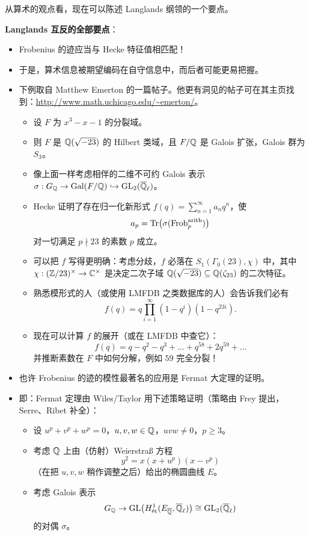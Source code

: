 从算术的观点看，现在可以陈述 Langlands 纲领的一个要点。

\textbf{Langlands 互反的全部要点}：
\begin{itemize}
\item Frobenius 的迹应当与 Hecke 特征值相匹配！
\item 于是，算术信息被期望编码在自守信息中，而后者可能更易把握。
\item 下例取自 Matthew Emerton 的一篇帖子。他更有洞见的帖子可在其主页找到：\url{http://www.math.uchicago.edu/~emerton/}。
\begin{itemize}
\item 设 $F$ 为 $x^3-x-1$ 的分裂域。
\item 则 $F$ 是 $\mathbb{Q}(\sqrt{-23})$ 的 Hilbert 类域，且 $F/\mathbb{Q}$ 是 Galois 扩张，Galois 群为 $S_3$。
\item 像上面一样考虑相伴的二维不可约 Galois 表示 $\sigma:G_{\mathbb{Q}}\to\operatorname{Gal}(F/\mathbb{Q})\hookrightarrow\operatorname{GL}_2(\overline{\mathbb{Q}}_\ell)$。
\item Hecke 证明了存在归一化新形式 $f(q)=\sum_{n=1}^\infty a_nq^n$，使
\[
a_p=\operatorname{Tr}\bigl(\sigma(\operatorname{Frob}_p^{\mathrm{arith}})\bigr)
\]
对一切满足 $p\nmid23$ 的素数 $p$ 成立。
\item 可以把 $f$ 写得更明确：考虑分歧，$f$ 必落在 $S_1(\Gamma_0(23),\chi)$ 中，其中 $\chi:(\mathbb{Z}/23)^\times\to\mathbb{C}^\times$ 是决定二次子域 $\mathbb{Q}(\sqrt{-23})\subseteq\mathbb{Q}(\zeta_{23})$ 的二次特征。
\item 熟悉模形式的人（或使用 LMFDB 之类数据库的人）会告诉我们必有
\[
f(q)=q\prod_{i=1}^\infty(1-q^i)(1-q^{23i}).
\]
\item 现在可以计算 $f$ 的展开（或在 LMFDB 中查它）：
\[
f(q)=q-q^2-q^3+\ldots+q^{58}+2q^{59}+\ldots
\]
并推断素数在 $F$ 中如何分解，例如 $59$ 完全分裂！
\end{itemize}
\item 也许 Frobenius 的迹的模性最著名的应用是 Fermat 大定理的证明。
\item 即：Fermat 定理由 Wiles/Taylor 用下述策略证明（策略由 Frey 提出，Serre、Ribet 补全）：
\begin{itemize}
\item 设 $u^p+v^p+w^p=0$，$u,v,w\in\mathbb{Q}$，$uvw\neq0$，$p\ge3$。
\item 考虑 $\mathbb{Q}$ 上由（仿射）Weierstraß 方程
\[
y^2=x(x+u^p)(x-v^p)
\]
（在把 $u,v,w$ 稍作调整之后）给出的椭圆曲线 $E$。
\item 考虑 Galois 表示
\[
G_{\mathbb{Q}}\to\operatorname{GL}\bigl(H^1_{\text{ét}}(E_{\overline{\mathbb{Q}}},\overline{\mathbb{Q}}_\ell)\bigr)\cong\operatorname{GL}_2(\overline{\mathbb{Q}}_\ell)
\]
的对偶 $\sigma$。

\end{itemize}
\end{itemize}
